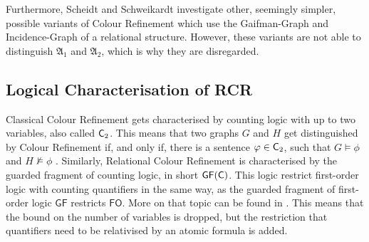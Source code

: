 Furthermore, Scheidt and Schweikardt investigate other, seemingly simpler, possible variants of Colour Refinement which use the Gaifman-Graph and Incidence-Graph of a relational structure.
However, these variants are not able to distinguish $\mathfrak A_1$ and $\mathfrak A_2$, which is why they are disregarded.

\subsection{Logical Characterisation of RCR}

Classical Colour Refinement gets characterised by counting logic with up to two variables, also called $\mathsf{C}_{2}$.
This means that two graphs $G$ and $H$ get distinguished by Colour Refinement if, and only if, there is a sentence $\varphi\in \mathsf{C}_{2}$, such that $G\models \phi$ and $H\not\models \phi$ \cite{immerman1990DescribingGraphs}.
Similarly, Relational Colour Refinement is characterised by the guarded fragment of counting logic, in short $\mathsf{GF}(\mathsf{C})$.
This logic restrict first-order logic with counting quantifiers in the same way, as the guarded fragment of first-order logic $\mathsf{GF}$ restricts $\mathsf{FO}$.
More on that topic can be found in \cite{gradel1999RestrainingPower}.
This means that the bound on the number of variables is dropped, but the restriction that quantifiers need to be relativised by an atomic formula is added.

